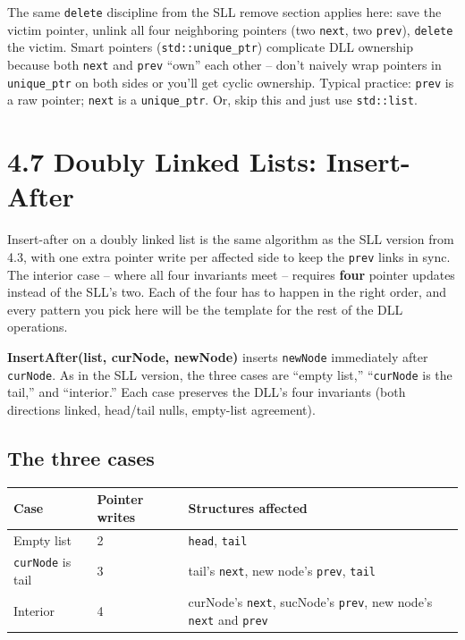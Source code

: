 \documentclass[11pt]{article}
\begin{document}
\begin{warnbox}
The same \texttt{delete} discipline from the SLL remove section
applies here: save the victim pointer, unlink all four
neighboring pointers (two \texttt{next}, two \texttt{prev}),
\texttt{delete} the victim. Smart pointers (\texttt{std::unique\_ptr})
complicate DLL ownership because both \texttt{next} and \texttt{prev}
``own'' each other -- don't naively wrap pointers in
\texttt{unique\_ptr} on both sides or you'll get cyclic ownership.
Typical practice: \texttt{prev} is a raw pointer; \texttt{next}
is a \texttt{unique\_ptr}. Or, skip this and just use
\texttt{std::list}.
\end{warnbox}

\section{4.7 Doubly Linked Lists: Insert-After}

Insert-after on a doubly linked list is the same algorithm as the
SLL version from 4.3, with one extra pointer write per affected
side to keep the \texttt{prev} links in sync. The interior case --
where all four invariants meet -- requires \textbf{four} pointer
updates instead of the SLL's two. Each of the four has to happen in
the right order, and every pattern you pick here will be the
template for the rest of the DLL operations.

\begin{defnbox}
\textbf{InsertAfter(list, curNode, newNode)} inserts
\texttt{newNode} immediately after \texttt{curNode}. As in the SLL
version, the three cases are ``empty list,'' ``\texttt{curNode} is
the tail,'' and ``interior.'' Each case preserves the DLL's four
invariants (both directions linked, head/tail nulls, empty-list
agreement).
\end{defnbox}

\subsection{The three cases}

\begin{center}
\footnotesize
\renewcommand{\arraystretch}{1.3}
\begin{tabular}{@{}p{3.8cm}p{3cm}p{5cm}@{}}
\hline
\textbf{Case} & \textbf{Pointer writes} & \textbf{Structures affected} \\
\hline
Empty list                      & 2 & \texttt{head}, \texttt{tail} \\
\texttt{curNode} is tail        & 3 & tail's \texttt{next}, new node's \texttt{prev}, \texttt{tail} \\
Interior                        & 4 & curNode's \texttt{next}, sucNode's \texttt{prev}, new node's \texttt{next} and \texttt{prev} \\
\hline
\end{tabular}
\end{center}
\end{document}

